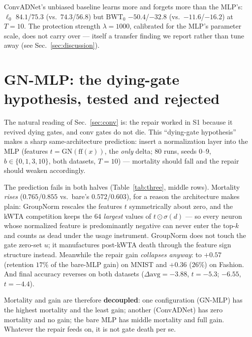 \documentclass[review]{elsarticle}
\begin{document}
ConvADNet's unbiased baseline learns more and forgets more than the
MLP's: $\ell_0$ $84.1$/$75.3$ (vs.\ $74.3$/$56.8$) but
$\mathrm{BWT}_0$ $-50.4$/$-32.8$ (vs.\ $-11.6$/$-16.2$) at $T{=}10$.
The protection strength $\lambda{=}1000$, calibrated for the MLP's
parameter scale, does not carry over --- itself a transfer finding we
report rather than tune away (see Sec.~\ref{sec:discussion}).

\section{GN-MLP: the dying-gate hypothesis, tested and rejected}
\label{sec:gnmlp}

The natural reading of Sec.~\ref{sec:conv} is: the repair worked in
S1 because it revived dying gates, and conv gates do not die. This
``dying-gate hypothesis'' makes a sharp same-architecture prediction:
insert a normalization layer into the MLP (features $t =
\mathrm{GN}(\mathrm{ff}(x))$, the \emph{only} delta; $80$ runs,
seeds $0$--$9$, $b \in \{0,1,3,10\}$, both datasets, $T{=}10$) ---
mortality should fall and the repair should weaken accordingly.

The prediction fails in both halves (Table~\ref{tab:three}, middle
rows). Mortality \emph{rises} ($0.765$/$0.855$ vs.\ bare's
$0.572$/$0.603$), for a reason the architecture makes plain:
GroupNorm rescales the features $t$ symmetrically about zero, and the
kWTA competition keeps the $64$ \emph{largest} values of $t \odot
\sigma(d)$ --- so every neuron whose normalized feature is
predominantly negative can never enter the top-$k$ and counts as
dead under the usage instrument. GroupNorm does not touch the gate
zero-set $u$; it manufactures post-kWTA death through the feature
sign structure instead. Meanwhile the repair gain \emph{collapses
anyway}: to
$+0.57$ (retention $17\%$ of the bare-MLP gain) on MNIST and $+0.36$
($26\%$) on Fashion. And final accuracy reverses on both datasets
($\Delta\mathrm{avg} = -3.88$, $t{=}-5.3$; $-6.55$, $t{=}-4.4$).

Mortality and gain are therefore \textbf{decoupled}: one configuration
(GN-MLP) has the highest mortality and the least gain; another
(ConvADNet) has zero mortality and no gain; the bare MLP has middle
mortality and full gain. Whatever the repair feeds on, it is not gate
death per se.
\end{document}
